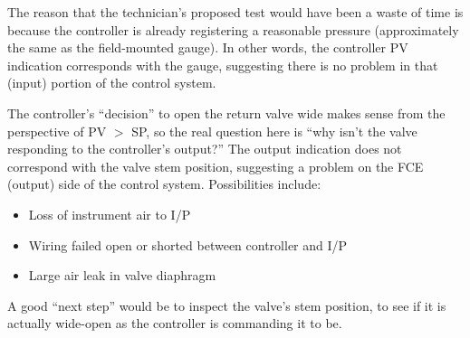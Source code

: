 





The reason that the technician's proposed test would have been a waste of time is because the controller is already registering a reasonable pressure (approximately the same as the field-mounted gauge).  In other words, the controller PV indication corresponds with the gauge, suggesting there is no problem in that (input) portion of the control system.
 






The controller's ``decision'' to open the return valve wide makes sense from the perspective of PV $>$ SP, so the real question here is ``why isn't the valve responding to the controller's output?''  The output indication does not correspond with the valve stem position, suggesting a problem on the FCE (output) side of the control system.  Possibilities include:

\begin{itemize}
\item{} Loss of instrument air to I/P
\item{} Wiring failed open or shorted between controller and I/P
\item{} Large air leak in valve diaphragm
\end{itemize}

A good ``next step'' would be to inspect the valve's stem position, to see if it is actually wide-open as the controller is commanding it to be.




